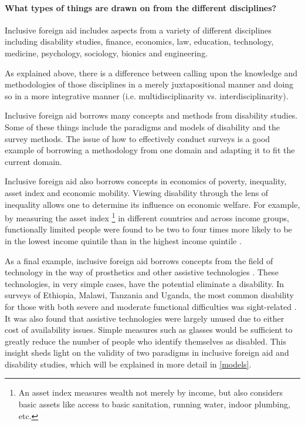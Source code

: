 \documentclass[a4paper]{article}
\begin{document}
\paragraph{What types of things are drawn on from the different disciplines?}

Inclusive foreign aid includes aspects from a variety of different disciplines
including disability studies, finance, economics, law, education, technology,
medicine, psychology, sociology, bionics and engineering.

As explained above, there is a difference between calling upon the knowledge and
methodologies of those disciplines in a merely juxtapositional manner and
doing so in a more integrative manner (i.e. multidisciplinarity vs.
interdisciplinarity).

Inclusive foreign aid borrows many concepts and methods from disability
studies. Some of these things include the paradigms and models of disability
and the survey methods. The issue of how to effectively conduct surveys is a
good example of borrowing a methodology from one domain and adapting it to fit
the current domain.

Inclusive foreign aid also borrows concepts in economics of poverty,
inequality, asset index and economic mobility. Viewing disability through the
lens of inequality allows one to determine its influence on economic welfare.
For example, by measuring the asset index \footnote{An asset index measures
wealth not merely by income, but also considers basic assets like access to
basic sanitation, running water, indoor plumbing, etc.} in different countries
and across income groups, functionally limited people were found to be two to
four times more likely to be in the lowest income quintile than in the highest
income quintile \citep{mitra2018disability}.

As a final example, inclusive foreign aid borrows concepts from the field of
technology in the way of prosthetics and other assistive technologies
\citep{roulstone2016disability}. These technologies, in very simple cases,
have the potential eliminate a disability. In surveys of Ethiopia, Malawi,
Tanzania and Uganda, the most common disability for those with both severe and
moderate functional difficulties was sight-related
\citep{mitra2018disability}. It was also found that assistive technologies
were largely unused due to either cost of availability issues. Simple measures
such as glasses would be sufficient to greatly reduce the number of people who
identify themselves as disabled. This insight sheds light on the validity of
two paradigms in inclusive foreign aid and disability studies, which will be
explained in more detail in \autoref{models}.
\end{document}
